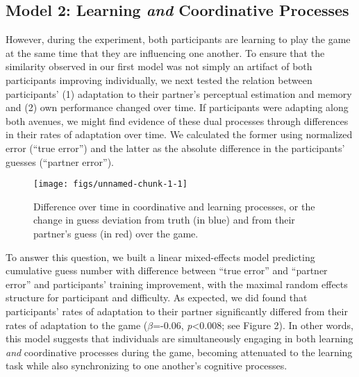 \documentclass[10pt, letterpaper]{article}
\newenvironment{CodeChunk}{}{}
\begin{document}
\subsection{\texorpdfstring{Model 2: Learning \emph{and} Coordinative
Processes}{Model 2: Learning and Coordinative Processes}}\label{model-2-learning-and-coordinative-processes}

However, during the experiment, both participants are learning to play
the game at the same time that they are influencing one another. To
ensure that the similarity observed in our first model was not simply an
artifact of both participants improving individually, we next tested the
relation between participants' (1) adaptation to their partner's
perceptual estimation and memory and (2) own performance changed over
time. If participants were adapting along both avenues, we might find
evidence of these dual processes through differences in their rates of
adaptation over time. We calculated the former using normalized error
(``true error'') and the latter as the absolute difference in the
participants' guesses (``partner error'').

\begin{CodeChunk}
\begin{figure}[H]

\texttt{[image: figs/unnamed-chunk-1-1]} \hfill{}

\caption[Difference over time in coordinative and learning processes, or the change in guess deviation from truth (in blue) and from their partner's guess (in red) over the game]{Difference over time in coordinative and learning processes, or the change in guess deviation from truth (in blue) and from their partner's guess (in red) over the game.}\label{fig:unnamed-chunk-1}
\end{figure}
\end{CodeChunk}

To answer this question, we built a linear mixed-effects model
predicting cumulative guess number with difference between ``true
error'' and ``partner error'' and participants' training improvement,
with the maximal random effects structure for participant and
difficulty. As expected, we did found that participants' rates of
adaptation to their partner significantly differed from their rates of
adaptation to the game (\emph{\(\beta\)}=-0.06,
\emph{p}\textless{}0.008; see Figure 2). In other words, this model
suggests that individuals are simultaneously engaging in both learning
\emph{and} coordinative processes during the game, becoming attenuated
to the learning task while also synchronizing to one another's cognitive
processes.
\end{document}
